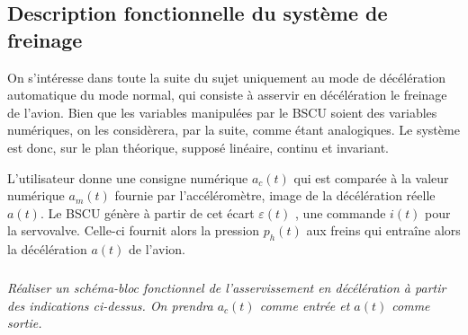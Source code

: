 \documentclass[10pt,fleqn]{article} %
\begin{document}
\begin{multicols}{2}
%
%
%
\fi
\section*{Description fonctionnelle du système de freinage}


%
%
%
\ifprof
\else
On s'intéresse dans toute la suite du sujet uniquement au mode de décélération automatique du mode normal, qui consiste à asservir en décélération le freinage de l'avion.
Bien que les variables manipulées par le BSCU soient des variables numériques, on les considèrera, par la suite, comme étant analogiques. Le système est donc, sur le plan théorique, supposé linéaire, continu et invariant.

L'utilisateur donne une consigne numérique $a_c(t)$ qui est comparée à la valeur numérique $a_m(t)$ fournie par l'accéléromètre, image de la décélération réelle $a(t)$. Le BSCU génère à partir de cet écart $\varepsilon(t)$ , une commande $i(t)$ pour la servovalve. Celle-ci fournit alors la pression $p_h(t)$ aux freins qui entraîne alors la décélération $a(t)$ de l'avion.
\fi

\subparagraph{}
\textit{Réaliser un schéma-bloc fonctionnel de l'asservissement en décélération à partir des
indications ci-dessus. On prendra $a_c(t)$ comme entrée et $a(t)$ comme sortie.}


\end{multicols}
\end{document}
